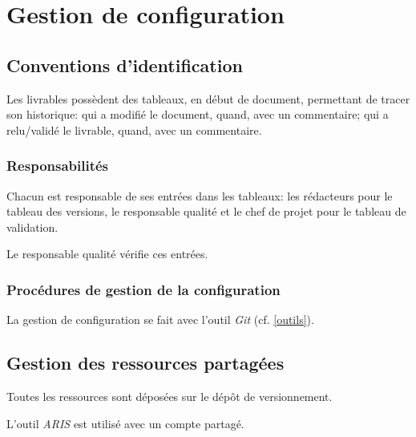 \section{Gestion de configuration}

\subsection{Conventions d'identification}
Les livrables possèdent des tableaux, en début de document, permettant
de tracer son historique: qui a modifié le document, quand, avec un
commentaire; qui a relu/validé le livrable, quand, avec un commentaire.

\subsubsection{Responsabilités}
Chacun est responsable de ses entrées dans les tableaux: les rédacteurs
pour le tableau des versions, le responsable qualité et le chef de projet
pour le tableau de validation.

Le responsable qualité vérifie ces entrées.

\subsubsection{Procédures de gestion de la configuration}
La gestion de configuration se fait avec l'outil \textsl{Git} (cf. \ref{outils}).


\subsection{Gestion des ressources partagées}
Toutes les ressources sont déposées sur le dépôt de versionnement.

L'outil \textsl{ARIS} est utilisé avec un compte partagé.
